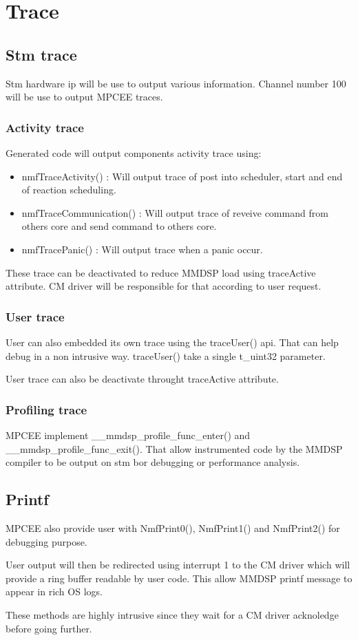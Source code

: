 \chapter{Trace}
\section{Stm trace}
Stm hardware ip will be use to output various information. Channel number 100
will be use to output MPCEE traces.
\subsection{Activity trace}
Generated code will output components activity trace using:
\begin{itemize}
  \item nmfTraceActivity() : Will output trace of post into scheduler, start and
  end of reaction scheduling.
  \item nmfTraceCommunication() : Will output trace of reveive command from
  others core and send command to others core.
  \item nmfTracePanic() : Will output trace when a panic occur.
\end{itemize}
These trace can be deactivated to reduce MMDSP load using traceActive attribute.
CM driver will be responsible for that according to user request.

\subsection{User trace}
User can also embedded its own trace using the traceUser() api. That can help
debug in a non intrusive way. traceUser() take a single t\_uint32 parameter.

User trace can also be deactivate throught traceActive attribute.

\subsection{Profiling trace}
MPCEE implement \_\_mmdsp\_profile\_func\_enter() and
\_\_mmdsp\_profile\_func\_exit(). That allow instrumented code by the MMDSP
compiler to be output on stm bor debugging or performance analysis.

\section{Printf}
MPCEE also provide user with NmfPrint0(), NmfPrint1() and NmfPrint2() for
debugging purpose.

User output will then be redirected using interrupt 1 to the
CM driver which will provide a ring buffer readable by user code. This allow
MMDSP printf message to appear in rich OS logs.

These methods are highly intrusive since they wait for a CM driver acknoledge
before going further.
